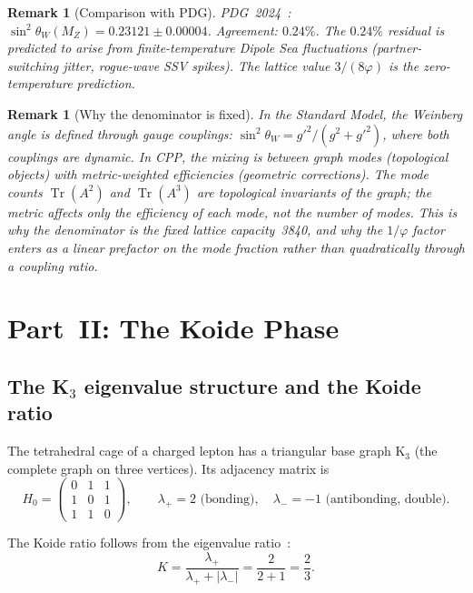 \documentclass[11pt,letterpaper]{article}
\newtheorem{remark}[theorem]{Remark}
\newcommand{\phig}{\varphi}
\newcommand{\Tr}{\operatorname{Tr}}
\begin{document}
\begin{remark}[Comparison with PDG]
PDG~2024~\citep{pdg2024}: $\sin^2\theta_W(M_Z) = 0.23121 \pm 0.00004$. Agreement: $0.24\%$. The $0.24\%$ residual is predicted to arise from finite-temperature Dipole Sea fluctuations (partner-switching jitter, rogue-wave SSV spikes). The lattice value $3/(8\phig)$ is the zero-temperature prediction.
\end{remark}

\begin{remark}[Why the denominator is fixed]
In the Standard Model, the Weinberg angle is defined through gauge couplings: $\sin^2\theta_W = g'^2/(g^2 + g'^2)$, where both couplings are dynamic. In CPP, the mixing is between \emph{graph modes} (topological objects) with \emph{metric-weighted efficiencies} (geometric corrections). The mode counts $\Tr(A^2)$ and $\Tr(A^3)$ are topological invariants of the graph; the metric affects only the \emph{efficiency} of each mode, not the \emph{number} of modes. This is why the denominator is the fixed lattice capacity~3840, and why the $1/\phig$ factor enters as a linear prefactor on the mode fraction rather than quadratically through a coupling ratio.
\end{remark}

\section{Part~II: The Koide Phase}
\label{sec:koide}

\subsection{The K$_3$ eigenvalue structure and the Koide ratio}
The tetrahedral cage of a charged lepton has a triangular base graph K$_3$ (the complete graph on three vertices). Its adjacency matrix is
\begin{equation}
H_0 = \begin{pmatrix} 0 & 1 & 1 \\ 1 & 0 & 1 \\ 1 & 1 & 0 \end{pmatrix}, \qquad \lambda_+ = 2 \text{ (bonding)},\quad \lambda_- = -1 \text{ (antibonding, double)}.
\label{eq:K3}
\end{equation}

The Koide ratio follows from the eigenvalue ratio~\citep{abshier2026sm3}:
\begin{equation}
K = \frac{\lambda_+}{\lambda_+ + |\lambda_-|} = \frac{2}{2+1} = \frac{2}{3}.
\label{eq:K23}
\end{equation}
\end{document}
